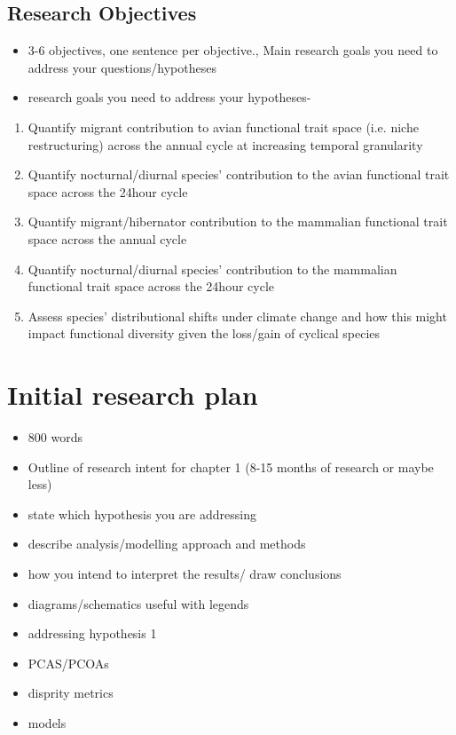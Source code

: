 \documentclass[11pt]{report}
\begin{document}
\subsection{Research Objectives}\label{subsec4}

\begin{itemize}
\item 3-6 objectives, one sentence per objective., Main research goals you need to address your questions/hypotheses
\item research goals you need to address your hypotheses- 
\end{itemize}

\begin{enumerate}
\item Quantify migrant contribution to avian functional trait space (i.e. niche restructuring) across the annual cycle at increasing temporal granularity
\item Quantify nocturnal/diurnal species' contribution to the avian functional trait space across the 24hour cycle
\item Quantify migrant/hibernator contribution to the mammalian functional trait space across the annual cycle
\item Quantify nocturnal/diurnal species' contribution to the mammalian functional trait space across the 24hour cycle
\item Assess species' distributional shifts under climate change and how this might impact functional diversity given the loss/gain of cyclical species
\end{enumerate}


\section{Initial research plan}\label{sec3}


\begin{itemize}
\item 800 words
\item Outline of research intent for chapter 1 (8-15 months of research or maybe less)
\item state which hypothesis you are addressing
\item describe analysis/modelling approach and methods
\item how you intend to interpret the results/ draw conclusions 
\item diagrams/schematics useful with legends
\end{itemize}

\begin{itemize}
\item addressing hypothesis 1  %
\end{itemize}

\begin{itemize}
\item PCAS/PCOAs
\item disprity metrics
\item models
\end{itemize}




\end{document}
